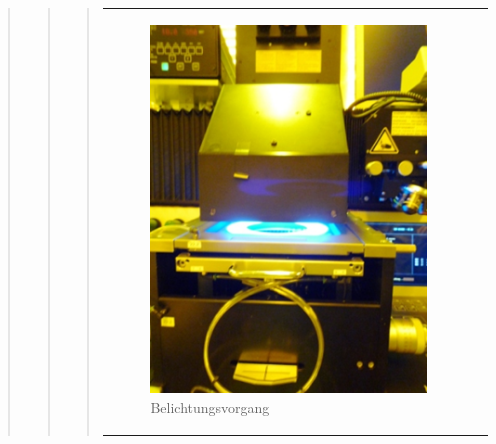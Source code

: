 \begin{quote}
\begin{quote}
\begin{quote}
    		\vspace{2em}
    
    		\begin{center}
                \begin{tabular}{ll}

                \hspace{-14em}
                    \begin{minipage}{0.6\textwidth}
                        \begin{figure}[H]
                        \hspace{2em}
                            \includegraphics[scale=1.0, trim = 0cm 0cm 0cm
                            0cm, clip]{./HerstellungBilder/Belichtungsvorgang.png}
                            \caption{Belichtungsvorgang}
                           \label{fig:belichtung}
                        \end{figure}

                    \end{minipage}
                    \begin{minipage}{0.6\textwidth} 


\end{minipage}
\end{tabular}
\end{center}
\end{quote}
\end{quote}
\end{quote}
